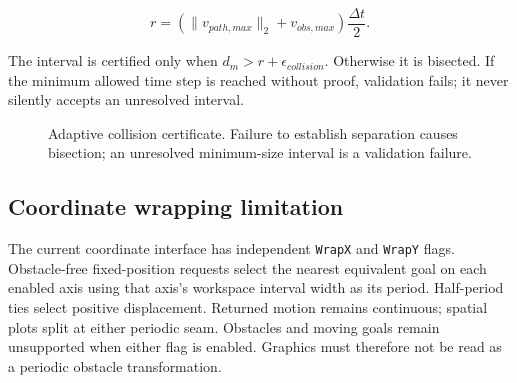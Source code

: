\documentclass[10pt,letterpaper]{article}
\newcommand{\file}[1]{\nolinkurl{#1}}
\begin{document}
\begin{equation}\label{eq:collisioncertificate}
r=\left(\lVert v_{path,max}\rVert_2+v_{obs,max}\right)
\frac{\Delta t}{2}.
\end{equation}

The interval is certified only when
$d_m>r+\epsilon_{collision}$. Otherwise it is bisected. If the minimum allowed
time step is reached without proof, validation fails; it never silently
accepts an unresolved interval.

\begin{figure}[ht]
\centering
{}
\caption{Adaptive collision certificate. Failure to establish separation
causes bisection; an unresolved minimum-size interval is a validation failure.}
\label{fig:adaptivevalidation}
\end{figure}

\subsection{Coordinate wrapping limitation}

The current coordinate interface has independent \file{WrapX} and
\file{WrapY} flags. Obstacle-free fixed-position requests select the nearest
equivalent goal on each enabled axis using that axis's workspace interval
width as its period. Half-period ties select positive displacement. Returned
motion remains continuous; spatial plots split at either periodic seam.
Obstacles and moving goals remain unsupported when either flag is enabled.
Graphics must therefore not be read as a periodic obstacle transformation.
\end{document}
